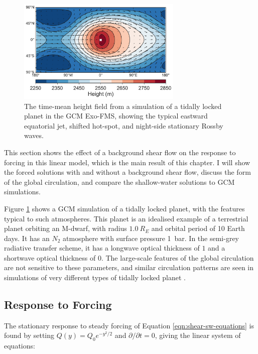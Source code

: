 \begin{figure}[t]
  \centering
    \includegraphics[width=0.7\textwidth]{figures/wave-mean-flow/example-gcm-results.pdf}
    \caption{The time-mean height field from a simulation of a tidally locked planet in the GCM Exo-FMS, showing the typical eastward equatorial jet, shifted hot-spot, and night-side stationary Rossby waves.}
    \label{fig:example-gcm-results}
\end{figure}

This section shows the effect of a background shear flow on the response to forcing in this linear model, which is the main result of this chapter. I will show the forced solutions with and without a background shear flow, discuss the form of the global circulation, and compare the shallow-water solutions to GCM simulations.

Figure \ref{fig:example-gcm-results} shows a GCM simulation of a tidally locked planet, with the features typical to such atmospheres. This planet is an idealised example of a terrestrial planet orbiting an M-dwarf, with radius $1.0\ R_{E}$ and orbital period of 10 Earth days. It has an $N_{2}$ atmosphere with surface pressure \SI{1}{\bar}. In the semi-grey radiative transfer scheme, it has a longwave optical thickness of $1$ and a shortwave optical thickness of $0$. The large-scale features of the global circulation are not sensitive to these parameters, and similar circulation patterns are seen in simulations of very different types of tidally locked planet \citep{showman2012review, heng2015review}.


\subsection{Response to Forcing}\label{sec:forcing-response}

The stationary response to steady forcing of Equation \ref{eqn:shear-sw-equations} is found by setting $Q(y)=Q_{0}e^{-y^{2}/2}$ \citep{matsuno1966quasi} and $\partial / \partial t = 0 $, giving the linear system of equations:


